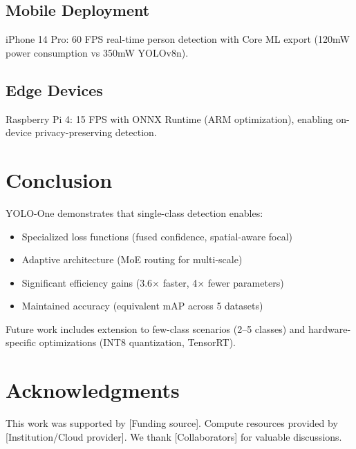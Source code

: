 \documentclass[conference]{IEEEtran}
\begin{document}
\subsection{Mobile Deployment}

iPhone 14 Pro: 60 FPS real-time person detection with Core ML export (120mW power consumption vs 350mW YOLOv8n).

\subsection{Edge Devices}

Raspberry Pi 4: 15 FPS with ONNX Runtime (ARM optimization), enabling on-device privacy-preserving detection.


\section{Conclusion}

YOLO-One demonstrates that single-class detection enables:
\begin{itemize}
\item Specialized loss functions (fused confidence, spatial-aware focal)
\item Adaptive architecture (MoE routing for multi-scale)
\item Significant efficiency gains (3.6$\times$ faster, 4$\times$ fewer parameters)
\item Maintained accuracy (equivalent mAP across 5 datasets)
\end{itemize}

Future work includes extension to few-class scenarios (2--5 classes) and hardware-specific optimizations (INT8 quantization, TensorRT).


\section*{Acknowledgments}

This work was supported by [Funding source]. Compute resources provided by [Institution/Cloud provider]. We thank [Collaborators] for valuable discussions.





\end{document}
